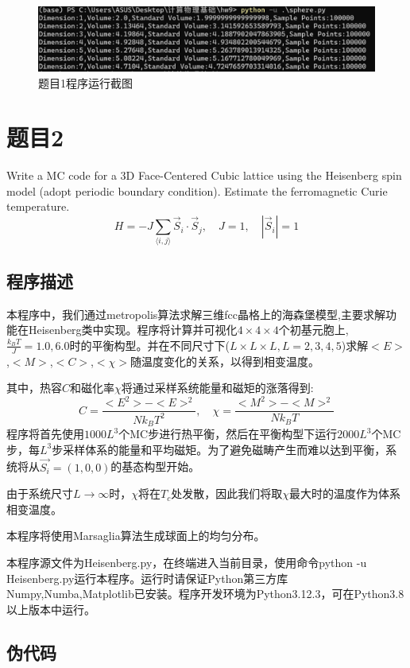 \documentclass[11pt]{article}
\begin{document}
  \begin{figure}
    \centering
    \includegraphics[width=0.6\linewidth]{photo/figp1.png}
    \caption{题目1程序运行截图}
    \label{fig:p1}
  \end{figure}

  \section{题目2}

  Write a MC code for a 3D Face-Centered Cubic lattice using the Heisenberg spin
model (adopt periodic boundary condition). Estimate the ferromagnetic Curie temperature.
\[
    H = -J \sum_{\langle i,j \rangle} \vec{S}_i \cdot \vec{S}_j, \quad J = 1, \quad |\vec{S}_i| = 1
\]

\subsection{程序描述}
本程序中，我们通过metropolis算法求解三维fcc晶格上的海森堡模型,主要求解功能在Heisenberg类中实现。程序将计算并可视化$4\times 4\times 4$个初基元胞上,$\frac{k_B T}{J}=1.0,6.0$时的平衡构型。并在不同尺寸下($L\times L\times L,L=2,3,4,5$)求解$<E>$,$<M>$,$<C>$,$<\chi>$随温度变化的关系，以得到相变温度。

其中，热容$C$和磁化率$\chi$将通过采样系统能量和磁矩的涨落得到:
\[
    C = \frac{<E^2>-<E>^2}{N k_B T^2},\quad \chi = \frac{<M^2>-<M>^2}{N k_B T}
\]
程序将首先使用$1000 L^3$个MC步进行热平衡，然后在平衡构型下运行$2000 L^3$个MC步，每$L^3$步采样体系的能量和平均磁矩。为了避免磁畴产生而难以达到平衡，系统将从$\vec{S_i}=(1,0,0)$的基态构型开始。

由于系统尺寸$L \to \infty$时，$\chi$将在$T_c$处发散，因此我们将取$\chi$最大时的温度作为体系相变温度。

本程序将使用Marsaglia算法生成球面上的均匀分布。

本程序源文件为Heisenberg.py，在终端进入当前目录，使用命令python -u Heisenberg.py运行本程序。运行时请保证Python第三方库Numpy,Numba,Matplotlib已安装。程序开发环境为Python3.12.3，可在Python3.8以上版本中运行。


\subsection{伪代码}
\end{document}
